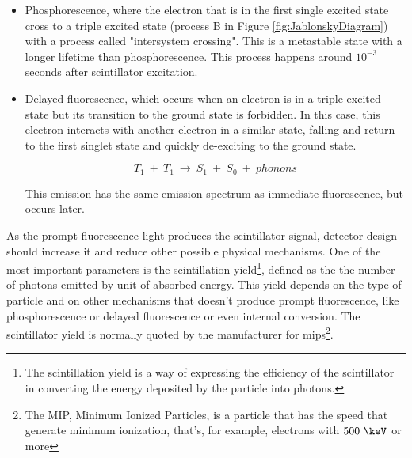 \begin{itemize}
\item{} Phosphorescence, where the electron that is in the first single excited state cross to a triple excited state (process B in Figure \ref{fig:JablonskyDiagram}) with a process called "intersystem crossing". This is a metastable state with a longer lifetime than phosphorescence. This process happens around $10^{-3}$ seconds after scintillator excitation.

\item{} Delayed fluorescence, which occurs when an electron is in a triple excited state but its transition to the ground state is forbidden. In this case, this electron interacts with another electron in a similar state, falling and return to the first singlet state and quickly de-exciting to the ground state. 

\begin{equation}
T_{1} ~+~ T_{1}~ \longrightarrow ~ S_{1} ~+~ S_{0} ~+~ phonons
\label{eq:DelayFluorescence}
\end{equation}

This emission has the same emission spectrum as immediate fluorescence, but occurs later.
\end{itemize}
As the prompt fluorescence light produces the scintillator signal, detector design should increase it and reduce other possible physical mechanisms. One of the most important parameters is the scintillation yield\footnote{The scintillation yield is a way of expressing the efficiency of the scintillator in converting the energy deposited by the particle into photons.}, defined as the the number of photons emitted by unit of absorbed energy. This yield depends on the type of particle and on other mechanisms that doesn't produce prompt fluorescence, like phosphorescence or delayed fluorescence or even internal conversion. The scintillator yield is normally quoted by the manufacturer for mips\footnote{The MIP, Minimum Ionized Particles, is a particle that has the speed that generate minimum ionization, that's, for example, electrons with $500~\keV$ or more}.
